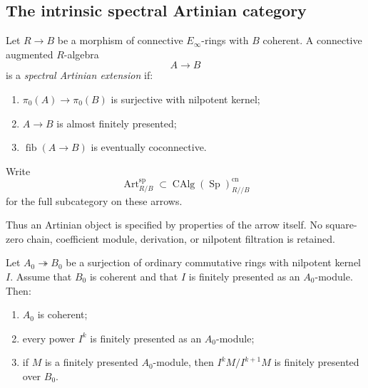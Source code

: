 \subsection{The intrinsic spectral Artinian category}

\begin{definition}
\label{def:bnla-spectral-artinian}
Let $R\to B$ be a morphism of connective $E_\infty$-rings with $B$ coherent.
A connective augmented $R$-algebra
\[
    A\longrightarrow B
\]
is a \emph{spectral Artinian extension} if:
\begin{enumerate}
    \item $\pi_0(A)\to\pi_0(B)$ is surjective with nilpotent kernel;
    \item $A\to B$ is almost finitely presented;
    \item $\operatorname{fib}(A\to B)$ is eventually coconnective.
\end{enumerate}
Write
\[
    \operatorname{Art}^{\mathrm{sp}}_{R/B}
    \subset
    \operatorname{CAlg}(\operatorname{Sp})^{\mathrm{cn}}_{R//B}
\]
for the full subcategory on these arrows.
\end{definition}

Thus an Artinian object is specified by properties of the arrow itself.  No
square-zero chain, coefficient module, derivation, or nilpotent filtration is
retained.

\begin{lemma}
\label{lem:bnla-coherent-nilpotent-ring}
Let $A_0\twoheadrightarrow B_0$ be a surjection of ordinary commutative
rings with nilpotent kernel $I$.  Assume that $B_0$ is coherent and that $I$
is finitely presented as an $A_0$-module.  Then:
\begin{enumerate}
    \item $A_0$ is coherent;
    \item every power $I^k$ is finitely presented as an $A_0$-module;
    \item if $M$ is a finitely presented $A_0$-module, then
    $I^kM/I^{k+1}M$ is finitely presented over $B_0$.
\end{enumerate}
\end{lemma}

